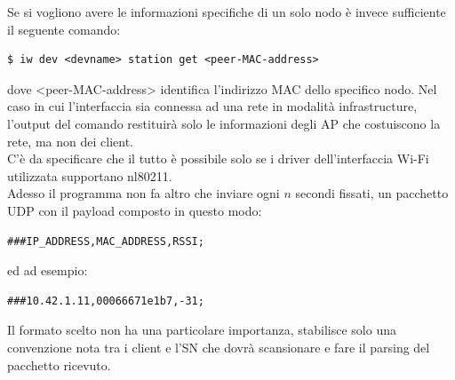 \documentclass[a4paper,11pt]{report}
\begin{document}

Se si vogliono avere le informazioni specifiche di un solo nodo è invece sufficiente il seguente comando:
\begin{lstlisting}
$ iw dev <devname> station get <peer-MAC-address>
\end{lstlisting}
dove <peer-MAC-address> identifica l'indirizzo MAC dello specifico nodo.
Nel caso in cui l'interfaccia sia connessa ad una rete in modalità infrastructure, l'output del comando restituirà solo le informazioni degli AP che costuiscono la rete, ma non dei client.\\
C'è da specificare che il tutto è possibile solo se i driver dell'interfaccia Wi-Fi utilizzata supportano nl80211. \\
Adesso il programma non fa altro che inviare ogni $n$ secondi fissati, un pacchetto UDP con il payload composto in questo modo:
\begin{lstlisting}
###IP_ADDRESS,MAC_ADDRESS,RSSI;
\end{lstlisting}
ed ad esempio:
\begin{lstlisting}
###10.42.1.11,00066671e1b7,-31;
\end{lstlisting}
Il formato scelto non ha una particolare importanza, stabilisce solo una convenzione nota tra i client e l'SN che dovrà scansionare e fare il parsing del pacchetto ricevuto.  
\end{document}
